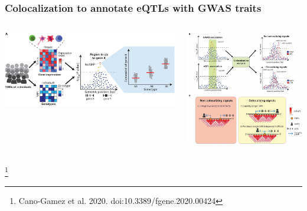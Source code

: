 \documentclass{beamer}
\newcommand\blfootnote[1]{%
    \begingroup
    \renewcommand\thefootnote{}\footnote{#1}%
    \addtocounter{footnote}{-1}%
    \endgroup
}
\begin{document}
    \begin{frame}
        \frametitle{Colocalization to annotate eQTLs with GWAS traits}

        \begin{columns}
            \begin{column}{0.5\textwidth}
                \begin{center}
                    \includegraphics[width=\textwidth]{../presentation_230120_gold2022_paris/fig/doi_10.3389_fgene.2020.00424_fig4a.jpg}
                \end{center}
            \end{column}
            \begin{column}{0.5\textwidth}
                \begin{center}
                    \includegraphics[width=\textwidth]{../presentation_230120_gold2022_paris/fig/doi_10.3389_fgene.2020.00424_fig4bc.png}
                \end{center}
            \end{column}
        \end{columns}

        \blfootnote{Cano-Gamez et al. 2020. doi:10.3389/fgene.2020.00424}
    \end{frame}
\end{document}
